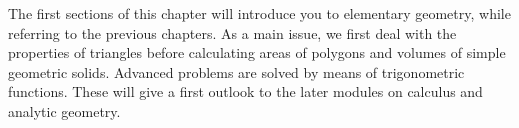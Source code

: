 
\newcommand{\MGrad}{^{\circ}}
\usepackage{ngerman}

\Mtikzexternalize

\MSetSubject{\MINTMathematics}




\begin{MSectionStart}

\MModstartBox

The first sections of this chapter will introduce you to elementary geometry, while referring 
to the previous chapters. As a main issue, we first deal with the properties of triangles before 
calculating areas of polygons and volumes of simple geometric solids. Advanced problems are solved 
by means of trigonometric functions. These will give a first outlook to the later modules 
on calculus and analytic geometry.

 
\end{MSectionStart}



